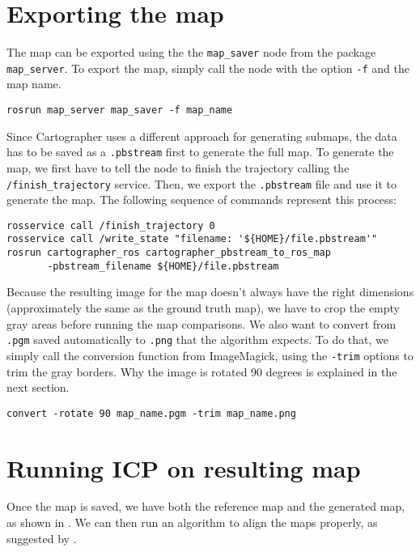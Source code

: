 \section{Exporting the map}

The map can be exported using the the \texttt{map\_saver} node from the package \texttt{map\_server}. To export the map, simply call the node with the option \texttt{-f} and the map name.

\begin{verbatim}
rosrun map_server map_saver -f map_name
\end{verbatim}

Since Cartographer uses a different approach for generating submaps, the data has to be saved as a \texttt{.pbstream} first to generate the full map. To generate the map, we first have to tell the node to finish the trajectory calling the \texttt{/finish\_trajectory} service. Then, we export the \texttt{.pbstream} file and use it to generate the map. The following sequence of commands represent this process:

\begin{verbatim}
rosservice call /finish_trajectory 0
rosservice call /write_state "filename: '${HOME}/file.pbstream'"
rosrun cartographer_ros cartographer_pbstream_to_ros_map 
       -pbstream_filename ${HOME}/file.pbstream
\end{verbatim}

Because the resulting image for the map doesn't always have the right dimensions (approximately the same as the ground truth map), we have to crop the empty gray areas before running the map comparisons. We also want to convert from \texttt{.pgm} saved automatically to \texttt{.png} that the algorithm expects. To do that, we simply call the conversion function from ImageMagick, using the \texttt{-trim} options to trim the gray borders. Why the image is rotated 90 degrees is explained in the next section.

\begin{verbatim}
convert -rotate 90 map_name.pgm -trim map_name.png
\end{verbatim}

\section{Running ICP on resulting map}

Once the map is saved, we have both the reference map and the generated map, as shown in . We can then run an algorithm to align the maps properly, as suggested by \citeauthor{santos2013evaluation}.

